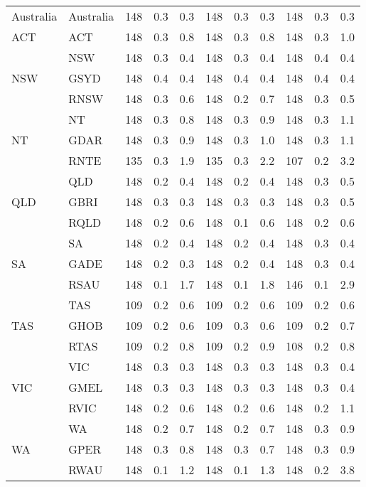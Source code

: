 \begin{table}[!ht]
{\begin{tabular}{llccccccccc}
      Australia & Australia & 148   & 0.3 & 0.3 & 148   & 0.3 & 0.3 & 148   & 0.3 & 0.3 \\
    ACT   & ACT   & 148   & 0.3 & 0.8 & 148   & 0.3 & 0.8 & 148   & 0.3 & 1.0 \\
    \multirow{3}[0]{*}{NSW} & NSW   & 148   & 0.3 & 0.4 & 148   & 0.3 & 0.4 & 148   & 0.4 & 0.4 \\
          & GSYD  & 148   & 0.4 & 0.4 & 148   & 0.4 & 0.4 & 148   & 0.4 & 0.4 \\
          & RNSW  & 148   & 0.3 & 0.6 & 148   & 0.2 & 0.7 & 148   & 0.3 & 0.5 \\
    \multirow{3}[0]{*}{NT} & NT    & 148   & 0.3 & 0.8 & 148   & 0.3 & 0.9 & 148   & 0.3 & 1.1 \\
          & GDAR  & 148   & 0.3 & 0.9 & 148   & 0.3 & 1.0 & 148   & 0.3 & 1.1 \\
          & RNTE  & 135   & 0.3 & 1.9 & 135   & 0.3 & 2.2 & 107   & 0.2 & 3.2 \\
    \multirow{3}[0]{*}{QLD} & QLD   & 148   & 0.2 & 0.4 & 148   & 0.2 & 0.4 & 148   & 0.3 & 0.5 \\
          & GBRI  & 148   & 0.3 & 0.3 & 148   & 0.3 & 0.3 & 148   & 0.3 & 0.5 \\
          & RQLD  & 148   & 0.2 & 0.6 & 148   & 0.1 & 0.6 & 148   & 0.2 & 0.6 \\
    \multirow{3}[0]{*}{SA} & SA    & 148   & 0.2 & 0.4 & 148   & 0.2 & 0.4 & 148   & 0.3 & 0.4 \\
          & GADE  & 148   & 0.2 & 0.3 & 148   & 0.2 & 0.4 & 148   & 0.3 & 0.4 \\
          & RSAU  & 148   & 0.1 & 1.7 & 148   & 0.1 & 1.8 & 146   & 0.1 & 2.9 \\
    \multirow{3}[0]{*}{TAS} & TAS   & 109   & 0.2 & 0.6 & 109   & 0.2 & 0.6 & 109   & 0.2 & 0.6 \\
          & GHOB  & 109   & 0.2 & 0.6 & 109   & 0.3 & 0.6 & 109   & 0.2 & 0.7 \\
          & RTAS  & 109   & 0.2 & 0.8 & 109   & 0.2 & 0.9 & 108   & 0.2 & 0.8 \\
    \multirow{3}[0]{*}{VIC} & VIC   & 148   & 0.3 & 0.3 & 148   & 0.3 & 0.3 & 148   & 0.3 & 0.4 \\
          & GMEL  & 148   & 0.3 & 0.3 & 148   & 0.3 & 0.3 & 148   & 0.3 & 0.4 \\
          & RVIC  & 148   & 0.2 & 0.6 & 148   & 0.2 & 0.6 & 148   & 0.2 & 1.1 \\
    \multirow{3}[1]{*}{WA} & WA    & 148   & 0.2 & 0.7 & 148   & 0.2 & 0.7 & 148   & 0.3 & 0.9 \\
          & GPER  & 148   & 0.3 & 0.8 & 148   & 0.3 & 0.7 & 148   & 0.3 & 0.9 \\
          & RWAU  & 148   & 0.1 & 1.2 & 148   & 0.1 & 1.3 & 148   & 0.2 & 3.8 \\


\end{tabular}}
\end{table}
